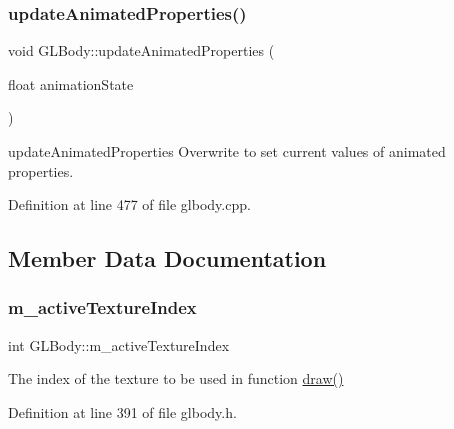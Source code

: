 \mbox{\label{class_g_l_body_a13dc56abce31b668719ff6cc53e1970a}} 
\subsubsection{\texorpdfstring{updateAnimatedProperties()}{updateAnimatedProperties()}}
{\footnotesize\ttfamily void G\+L\+Body\+::update\+Animated\+Properties (\begin{DoxyParamCaption}\item[{float}]{animation\+State }\end{DoxyParamCaption})\hspace{0.3cm}{\ttfamily [virtual]}}



update\+Animated\+Properties Overwrite to set current values of animated properties. 



Definition at line 477 of file glbody.\+cpp.



\subsection{Member Data Documentation}
\mbox{\label{class_g_l_body_ad21b09d906e63e5c222ccb96e4d242df}} 
\subsubsection{\texorpdfstring{m\_activeTextureIndex}{m\_activeTextureIndex}}
{\footnotesize\ttfamily int G\+L\+Body\+::m\+\_\+active\+Texture\+Index\hspace{0.3cm}{\ttfamily [protected]}}

The index of the texture to be used in function \mbox{\hyperlink{class_g_l_body_aaeb47c0a8cfc36caed81fc139c42ddfc}{draw()}} 

Definition at line 391 of file glbody.\+h.

\mbox{\label{class_g_l_body_ac3a56048c861a5bdd11b344e1e24946b}} 

